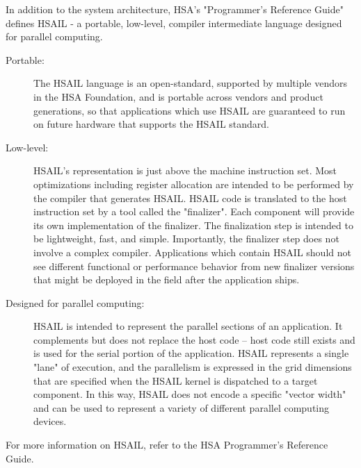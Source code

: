 \documentclass[draft]{book}
\begin{document}
In addition to the system architecture, HSA's "Programmer's Reference Guide"
defines HSAIL - a portable, low-level, compiler intermediate language designed
for parallel computing.

\begin{description}
\item[Portable:] The HSAIL language is an open-standard, supported by multiple
  vendors in the HSA Foundation, and is portable across vendors and product
  generations, so that applications which use HSAIL are guaranteed to run on
  future hardware that supports the HSAIL standard.
\item[Low-level:] HSAIL's representation is just above the machine instruction
  set. Most optimizations including register allocation are intended to be
  performed by the compiler that generates HSAIL. HSAIL code is translated to
  the host instruction set by a tool called the "finalizer". Each component
  will provide its own implementation of the finalizer. The finalization step
  is intended to be lightweight, fast, and simple. Importantly, the finalizer
  step does not involve a complex compiler. Applications which contain HSAIL
  should not see different functional or performance behavior from new finalizer
  versions that might be deployed in the field after the application ships.
\item[Designed for parallel computing:] HSAIL is intended to represent the
  parallel sections of an application. It complements but does not replace the
  host code – host code still exists and is used for the serial portion of the
  application. HSAIL represents a single "lane" of execution, and the
  parallelism is expressed in the grid dimensions that are specified when the
  HSAIL kernel is dispatched to a target component. In this way, HSAIL does not
  encode a specific "vector width" and can be used to represent a variety of
  different parallel computing devices.
\end{description}

For more information on HSAIL, refer to the HSA Programmer's Reference Guide.
\end{document}
